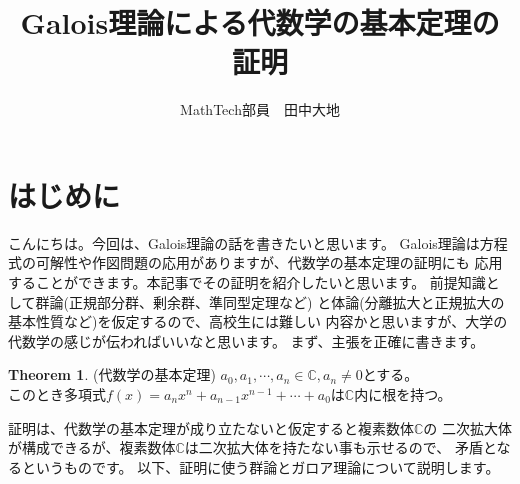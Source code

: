 \documentclass{ltjsarticle}
\title{Galois理論による代数学の基本定理の証明}
\author{MathTech部員　田中大地}
\date{}
\theoremstyle{definition}
\newtheorem{theorem}[definition]{Theorem}
\begin{document}
\maketitle
\section{はじめに}
こんにちは。今回は、Galois理論の話を書きたいと思います。
Galois理論は方程式の可解性や作図問題の応用がありますが、代数学の基本定理の証明にも
応用することができます。本記事でその証明を紹介したいと思います。
前提知識として群論(正規部分群、剰余群、準同型定理など)
と体論(分離拡大と正規拡大の基本性質など)を仮定するので、高校生には難しい
内容かと思いますが、大学の代数学の感じが伝わればいいなと思います。
まず、主張を正確に書きます。
\begin{theorem}\label{algethm}(代数学の基本定理)
 $ a_0,a_1,\cdots ,a_n \in \mathbb{C},a_n\ne 0$とする。\\
 このとき多項式$f(x)=a_nx^n+a_{n-1}x^{n-1}+\cdots +a_0 $は$\mathbb{C}$内に根を持つ。
\end{theorem}
証明は、代数学の基本定理が成り立たないと仮定すると複素数体$\mathbb{C}$の
二次拡大体が構成できるが、複素数体$\mathbb{C}$は二次拡大体を持たない事も示せるので、
矛盾となるというものです。
以下、証明に使う群論とガロア理論について説明します。
\end{document}
